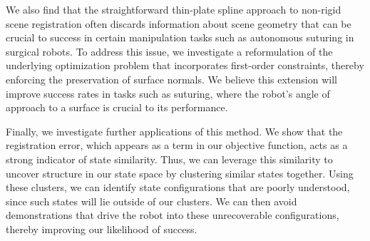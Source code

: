 \documentclass{article}
\begin{document}
We also find that the straightforward thin-plate spline approach to non-rigid scene registration often discards information about scene geometry that can be crucial to success in certain manipulation tasks such as autonomous suturing in surgical robots. To address this issue, we investigate a reformulation of the underlying optimization problem that incorporates first-order constraints, thereby enforcing the preservation of surface normals. We believe this extension will improve success rates in tasks such as suturing, where the robot's angle of approach to a surface is crucial to its performance.

Finally, we investigate further applications of this method. We show that the registration error, which appears as a term in our objective function, acts as a strong indicator of state similarity. Thus, we can leverage this similarity to uncover structure in our state space by clustering similar states together. Using these clusters, we can identify state configurations that are poorly understood, since such states will lie outside of our clusters. We can then avoid demonstrations that drive the robot into these unrecoverable configurations, thereby improving our likelihood of success.



\end{document}
